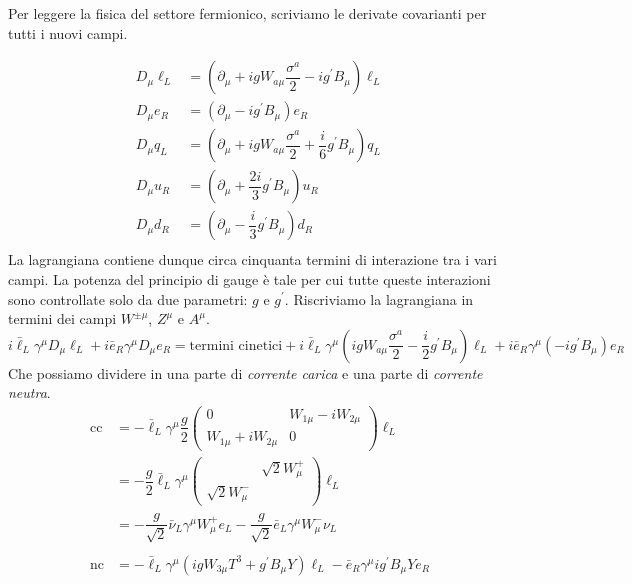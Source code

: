 \documentclass[italian,a4paper]{article}
\theoremstyle{definition}
\newcommand{\dimu}{\ensuremath{\partial_{\mu}}}
\newcommand{\Dimu}{\ensuremath{D_{\mu}}}
\begin{document}
Per leggere la fisica del settore fermionico, scriviamo le derivate
covarianti per tutti i nuovi campi.

\begin{align*}
    \Dimu \ell_L &= 
    (\dimu + i g W_{a\mu}\dfrac{\sigma^a}{2} - i g^{\prime} B_\mu) \ell_L\\
    \Dimu e_R &= (\dimu - i g^\prime B_\mu) e_R\\
    \Dimu q_L &= 
    (\dimu + i g W_{a\mu}\dfrac{\sigma^a}{2} + \dfrac{i}{6} g^{\prime}
    B_\mu) q_L\\
    \Dimu u_R &= (\dimu + \dfrac{2i}{3} g^\prime B_\mu) u_R\\
    \Dimu d_R &= (\dimu - \dfrac{i}{3} g^\prime B_\mu) d_R\\
\end{align*}
La lagrangiana contiene dunque circa cinquanta termini di interazione tra i
vari campi. La potenza del principio di gauge \`e tale per cui tutte queste
interazioni sono controllate solo da due parametri: $g$ e $g^\prime$.
Riscriviamo la lagrangiana in termini dei campi $W^{\pm\mu}$, $Z^\mu$ e
$A^\mu$.
\begin{equation*}
    i \bar{\ell}_L \gamma^\mu \Dimu \ell_L + 
    i \bar{e}_R \gamma^\mu \Dimu e_R =
    \text{termini cinetici} +
    i \bar{\ell}_L \gamma^\mu \left( i g W_{a\mu} \dfrac{\sigma^a}{2} -
    \dfrac{i}{2} g^{\prime} B_\mu \right) \ell_L + 
    i \bar{e}_R \gamma^\mu (-i g^{\prime} B_\mu) e_R
\end{equation*}
Che possiamo dividere in una parte di \emph{corrente carica} e una parte di
\emph{corrente neutra}.
\begin{align*}
    \text{cc} &=
    -\bar{\ell}_L \gamma^\mu \dfrac{g}{2}
    \begin{pmatrix}
        0 & W_{1\mu} - i W_{2\mu}\\
        W_{1\mu} + i W_{2\mu} & 0
    \end{pmatrix}
    \ell_L\\
    &= 
    -\dfrac{g}{2}\bar{\ell}_L \gamma^\mu 
    \begin{pmatrix}
        & \sqrt{2} W^+_\mu\\
        \sqrt{2} W^-_\mu & 
    \end{pmatrix}
    \ell_L\\
    &=
    -\dfrac{g}{\sqrt{2}} \bar{\nu}_L \gamma^\mu W^+_\mu e_L
    -\dfrac{g}{\sqrt{2}} \bar{e}_L \gamma^\mu W^-_\mu  \nu_L\\
    \\
    \text{nc}
    &= 
    -\bar{\ell}_L \gamma^\mu (i g W_{3\mu}T^3 + g^{\prime} B_\mu Y) \ell_L
    -\bar{e}_R \gamma^\mu ig^{\prime} B_\mu Y e_R
\end{align*}
\end{document}
